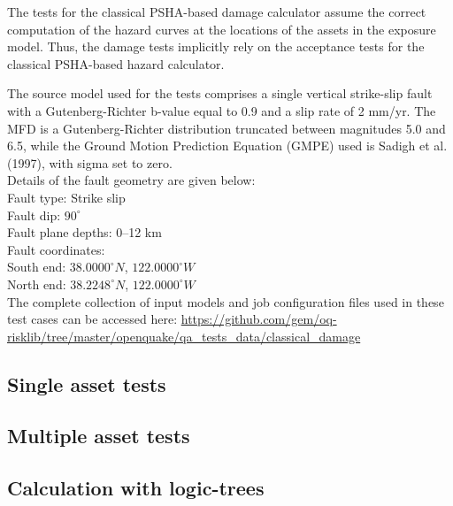 The tests for the classical PSHA-based damage calculator assume the correct computation of the hazard curves at the locations of the assets in the exposure model. Thus, the damage tests implicitly rely on the acceptance tests for the classical PSHA-based hazard calculator.

The source model used for the tests comprises a single vertical strike-slip fault with a Gutenberg-Richter b-value equal to 0.9 and a slip rate of 2 mm/yr. The MFD is a Gutenberg-Richter distribution truncated between magnitudes 5.0 and 6.5, while the Ground Motion Prediction Equation (GMPE) used is Sadigh et al. (1997), with sigma set to zero.\\

\noindent Details of the fault geometry are given below:\\

\noindent
Fault type: Strike slip\\
Fault dip: $90^{\circ}$\\
Fault plane depths: 0--12 km\\
Fault coordinates:\\
South end: $38.0000^{\circ} N$, $122.0000^{\circ} W$\\
North end: $38.2248^{\circ} N$, $122.0000^{\circ} W$\\

The complete collection of input models and job configuration files used in these test cases can be accessed here:
\href{https://github.com/gem/oq-risklib/tree/master/openquake/qa_tests_data/classical_damage}
{https://github.com/gem/oq-risklib/tree/master/openquake/qa\_tests\_data/classical\_damage}

\subsection{Single asset tests}
\label{subsec:cd-single}


\subsection{Multiple asset tests}
\label{subsec:cd-multiple}


\subsection{Calculation with logic-trees}
\label{subsec:cd-lt}
